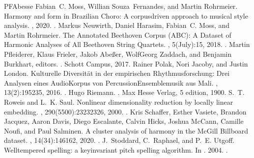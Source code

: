 \documentclass[letterpaper,10pt,english]{sphinxmanual}
\begin{document}
\begin{sphinxthebibliography}{PFAbesse}
Fabian C. Moss, Willian Souza Fernandes, and Martin Rohrmeier. Harmony and form in Brazilian Choro: A corpus\sphinxhyphen{}driven approach to musical style analysis. , 2020. .
Markus Neuwirth, Daniel Harasim, Fabian C. Moss, and Martin Rohrmeier. The Annotated Beethoven Corpus (ABC): A Dataset of Harmonic Analyses of All Beethoven String Quartets. , 5(July):1\textendash{}5, 2018. .
Martin Pfleiderer, Klaus Frieler, Jakob Abeßer, Wolf\sphinxhyphen{}Georg Zaddach, and Benjamin Burkhart, editors. . Schott Campus, 2017.
Rainer Polak, Nori Jacoby, and Justin London. Kulturelle Diversität in der empirischen Rhythmusforschung: Drei Analysen eines Audio\sphinxhyphen{}Korpus von Percussion\sphinxhyphen{}Ensemblemusik aus Mali. , 13(2):195\textendash{}235, 2016. .
Hugo Riemann. . Max Hesse Verlag, 5 edition, 1900.
S. T. Roweis and L. K. Saul. Nonlinear dimensionality reduction by locally linear embedding. , 290(5500):2323\textendash{}2326, 2000. .
Kris Schaffer, Esther Vasiete, Brandon Jacquez, Aaron Davis, Diego Escalante, Calvin Hicks, Joshua McCann, Camille Noufi, and Paul Salminen. A cluster analysis of harmony in the McGill Billboard dataset. , 14(3\textendash{}4):146\textendash{}162, 2020. .
J. Stoddard, C. Raphael, and P. E. Utgoff. Well\sphinxhyphen{}tempered spelling: a key\sphinxhyphen{}invariant pitch spelling algorithm. In . 2004. .

\end{sphinxthebibliography}
\end{document}
